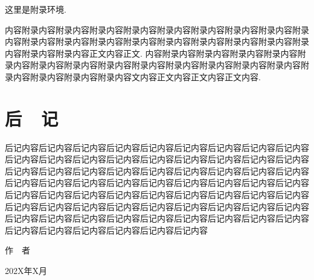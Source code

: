 \documentclass[UTF8,openany,twoside,12pt]{ctexbook}
\theoremstyle{plain}
\begin{document}
这里是附录环境.

内容附录内容附录内容附录内容附录内容附录内容附录内容附录内容附录内容附录内容附录内容附录内容附录内容附录内容附录内容附录内容附录内容附录内容附录内容附录内容附录内容正文内容正文. 内容附录内容附录内容附录内容附录内容附录内容附录内容附录内容附录内容附录内容附录内容附录内容附录内容附录内容附录内容附录内容附录内容附录内容文内容正文内容正文内容正文内容.




\backmatter  %



\clearpage
\renewcommand\indexname{索~~引}
{}
\printindex




\chapter{后~~记}

后记内容后记内容后记内容后记内容后记内容后记内容后记内容后记内容后记内容后记内容后记内容后记内容后记内容后记内容后记内容后记内容后记内容后记内容后记内容后记内容后记内容后记内容后记内容后记内容后记内容后记内容后记内容后记内容后记内容后记内容后记内容后记内容后记内容后记内容后记内容后记内容后记内容后记内容后记内容后记内容后记内容后记内容后记内容后记内容后记内容后记内容后记内容后记内容后记内容后记内容后记内容后记内容后记内容后记内容后记内容后记内容后记内容后记内容后记内容后记内容后记内容后记内容后记内容后记内容后记内容后记内容后记内容后记内容后记内容


\vspace{5ex}
\begin{flushright}
作~~者~~~~~~~~~

202X年X月~~~~~
\end{flushright}
\end{document}
